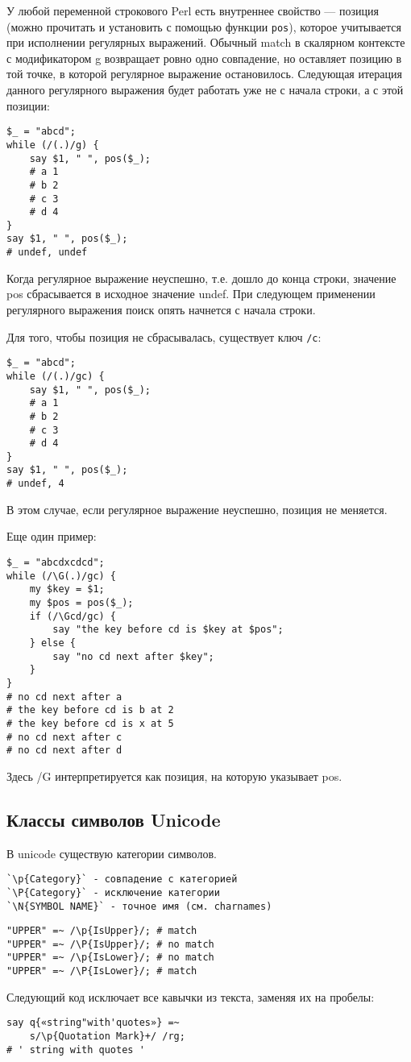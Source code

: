 У любой переменной строкового Perl есть внутреннее свойство --- позиция (можно прочитать и установить с помощью функции \verb|pos|), которое учитывается при исполнении регулярных выражений. Обычный match в скалярном контексте с модификатором g возвращает ровно одно совпадение, но оставляет позицию в той точке, в которой регулярное выражение остановилось. Следующая итерация данного регулярного выражения будет работать уже не с начала строки, а с этой позиции:
\begin{verbatim}
$_ = "abcd";
while (/(.)/g) {
    say $1, " ", pos($_);
    # a 1
    # b 2
    # c 3
    # d 4
}
say $1, " ", pos($_);
# undef, undef
\end{verbatim}
Когда регулярное выражение неуспешно, т.е. дошло до конца строки, значение pos сбрасывается в исходное значение undef. При следующем применении регулярного выражения поиск опять начнется с начала строки.

Для того, чтобы позиция не сбрасывалась, существует ключ \verb|/c|:
\begin{verbatim}
$_ = "abcd";
while (/(.)/gc) {
    say $1, " ", pos($_);
    # a 1
    # b 2
    # c 3
    # d 4
}
say $1, " ", pos($_);
# undef, 4
\end{verbatim}
В этом случае, если регулярное выражение неуспешно, позиция не меняется.

Еще один пример:
\begin{verbatim}
$_ = "abcdxcdcd";
while (/\G(.)/gc) {
    my $key = $1;
    my $pos = pos($_);
    if (/\Gcd/gc) {
        say "the key before cd is $key at $pos";
    } else {
        say "no cd next after $key";
    }
}
# no cd next after a
# the key before cd is b at 2
# the key before cd is x at 5
# no cd next after c
# no cd next after d
\end{verbatim}
Здесь /G интерпретируется как позиция, на которую указывает pos.

\subsection{Классы символов Unicode}
В unicode существую категории символов.
\begin{verbatim}
`\p{Category}` - совпадение с категорией
`\P{Category}` - исключение категории
`\N{SYMBOL NAME}` - точное имя (см. charnames)
\end{verbatim}

\begin{verbatim}
"UPPER" =~ /\p{IsUpper}/; # match
"UPPER" =~ /\P{IsUpper}/; # no match
"UPPER" =~ /\p{IsLower}/; # no match
"UPPER" =~ /\P{IsLower}/; # match
\end{verbatim}
Следующий код исключает все кавычки из текста, заменяя их на пробелы:
\begin{verbatim}
say q{«string"with'quotes»} =~
    s/\p{Quotation Mark}+/ /rg;
# ' string with quotes '
\end{verbatim}

